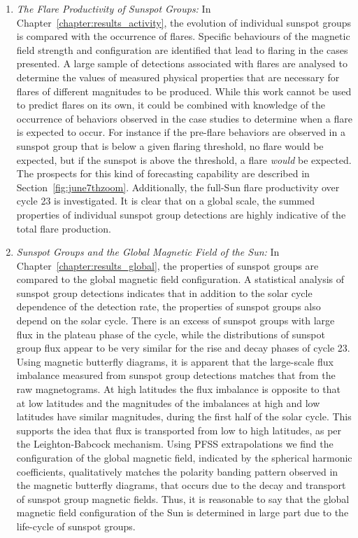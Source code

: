 \begin{enumerate}
\item \emph{The Flare Productivity of Sunspot Groups:} In Chapter~\ref{chapter:results_activity}, the evolution of individual sunspot groups is compared with the occurrence of flares. Specific behaviours of the magnetic field strength and configuration are identified that lead to flaring in the cases presented. A large sample of detections associated with flares are analysed to determine the values of measured physical properties that are necessary for flares of different magnitudes to be produced. While this work cannot be used to predict flares on its own, it could be combined with knowledge of the occurrence of behaviors observed in the case studies to determine when a flare is expected to occur. For instance if the pre-flare behaviors are observed in a sunspot group that is below a given flaring threshold, no flare would be expected, but if the sunspot is above the threshold, a flare \emph{would} be expected. The prospects for this kind of forecasting capability are described in Section~\ref{fig:june7thzoom}. Additionally, the full-Sun flare productivity over cycle 23 is investigated. It is clear that on a global scale, the summed properties of individual sunspot group detections are highly indicative of the total flare production. 
\item \emph{Sunspot Groups and the Global Magnetic Field of the Sun:} In Chapter~\ref{chapter:results_global}, the properties of sunspot groups are compared to the global magnetic field configuration. A statistical analysis of sunspot group detections indicates that in addition to the solar cycle dependence of the detection rate, the properties of sunspot groups also depend on the solar cycle. There is an excess of sunspot groups with large flux in the plateau phase of the cycle, while the distributions of sunspot group flux appear to be very similar for the rise and decay phases of cycle 23. Using magnetic butterfly diagrams, it is apparent that the large-scale flux imbalance measured from sunspot group detections matches that from the raw magnetograms. At high latitudes the flux imbalance is opposite to that at low latitudes and  the magnitudes of the imbalances at high and low latitudes  have similar magnitudes, during the first half of the solar cycle. This supports the idea that flux is transported from low to high latitudes, as per the Leighton-Babcock mechanism. Using \gls{PFSS} extrapolations we find the configuration of the global magnetic field, indicated by the spherical harmonic coefficients, qualitatively matches the polarity banding pattern observed in the magnetic butterfly diagrams, that occurs due to the decay and transport of sunspot group magnetic fields. Thus, it is reasonable to say that the global magnetic field configuration of the Sun is determined in large part due to the life-cycle of sunspot groups.

\end{enumerate}
